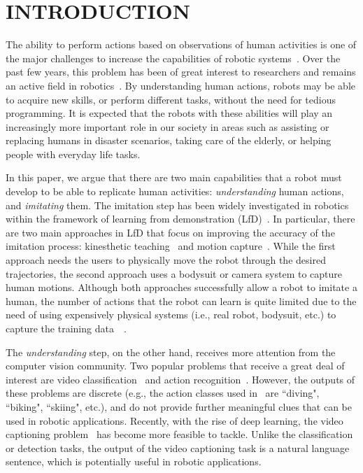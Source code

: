 \section{INTRODUCTION} \label{Sec:Intro}
The ability to perform actions based on observations of human activities is one of the major challenges to increase the capabilities of robotic systems~\cite{Chrystopher09}. Over the past few years, this problem has been of great interest to researchers and remains an active field in robotics~\cite{Ramirez2015}. By understanding human actions, robots may be able to acquire new skills, or perform different tasks, without the need for tedious programming. It is expected that the robots with these abilities will play an increasingly more important role in our society in areas such as assisting or replacing humans in disaster scenarios, taking care of the elderly, or helping people with everyday life tasks.

In this paper, we argue that there are two main capabilities that a robot must develop to be able to replicate human activities: \textit{understanding} human actions, and \textit{imitating} them. The imitation step has been widely investigated in robotics within the framework of learning from demonstration (LfD)~\cite{Brenna2009}. In particular, there are two main approaches in LfD that focus on improving the accuracy of the imitation process: kinesthetic teaching~\cite{Akgun2012} and motion capture~\cite{Koenemann2014}. While the first approach needs the users to physically move the robot through the desired trajectories, the second approach uses a bodysuit or camera system to capture human motions. Although both approaches successfully allow a robot to imitate a human, the number of actions that the robot can learn is quite limited due to the need of using expensively physical systems (i.e., real robot, bodysuit, etc.) to capture the training data~\cite{Akgun2012}~\cite{Koenemann2014}. 

The \textit{understanding} step, on the other hand, receives more attention from the computer vision community. Two popular problems that receive a great deal of interest are video classification~\cite{Karpathy2014} and action recognition~\cite{Simonyan2014}. However, the outputs of these problems are discrete (e.g., the action classes used in~\cite{Simonyan2014} are ``diving", ``biking", ``skiing", etc.), and do not provide further meaningful clues that can be used in robotic applications. Recently, with the rise of deep learning, the video captioning problem~\cite{Venugopalan2016} has become more feasible to tackle. Unlike the classification or detection tasks, the output of the video captioning task is a natural language sentence, which is potentially useful in robotic applications.


